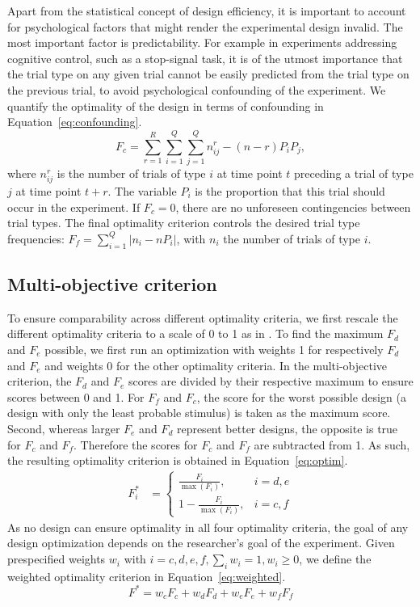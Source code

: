 \documentclass[article]{jss}
\begin{document}
Apart from the statistical concept of design efficiency, it is important to account for psychological factors that might render the experimental design invalid.  The most important factor is predictability.  For example in experiments addressing cognitive control, such as a stop-signal task, it is of the utmost importance that the trial type on any given trial cannot be easily predicted from the trial type on the previous trial, to avoid psychological confounding of the experiment.  We quantify the optimality of the design in terms of confounding in Equation~\ref{eq:confounding}.
\begin{equation} \label{eq:confounding}
F_c = \sum_{r=1}^R \sum_{i=1}^Q \sum_{j=1}^Q {n_{ij}^{r}-(n-r)P_iP_j },
\end{equation}
%
where $n_{ij}^r$ is the number of trials of type $i$ at time point $t$
preceding a trial of type $j$ at time point $t+r$.  The variable $P_i$
is the proportion that this trial should occur in the experiment.  If
$F_c=0$, there are no unforeseen contingencies between trial types.
The final optimality criterion controls the desired trial type
frequencies: $F_f = \sum_{i=1}^Q | n_i-nP_i | $, with $n_i$ the number
of trials of type $i$.

\subsection{Multi-objective criterion}

To ensure comparability across different optimality criteria, we first
rescale the different optimality criteria to a scale of 0 to 1 as in
\citet{Kao2009-yo}.  To find the maximum $F_d$ and $F_e$ possible, we
first run an optimization with weights 1 for respectively $F_d$ and
$F_e$ and weights 0 for the other optimality criteria.  In the
multi-objective criterion, the $F_d$ and $F_e$ scores are divided by
their respective maximum to ensure scores between 0 and 1.  For $F_f$
and $F_c$, the score for the worst possible design (a design with only
the least probable stimulus) is taken as the maximum score.  Second,
whereas larger $F_e$ and $F_d$ represent better designs, the opposite
is true for $F_c$ and $F_f$.  Therefore the scores for $F_c$ and $F_f$
are subtracted from 1.  As such, the resulting optimality criterion is
obtained in Equation~\ref{eq:optim}.
%
\begin{align} \label{eq:optim}
  F_i^* &= \left\{
\begin{array}{ll}
  \frac{F_i}{\max(F_i)},& i=d,e \\
  1-\frac{F_i}{\max(F_i)},&i=c,f
\end{array}\right.                            
\end{align}
%
As no design can ensure optimality in all four optimality criteria, the goal of any design optimization depends on the researcher's goal of the experiment.  Given prespecified weights $w_i$ with $i=c,d,e,f, \sum_iw_i=1,w_i\geq0$, we define the weighted optimality criterion in Equation~\ref{eq:weighted}.
%
\begin{equation}\label{eq:weighted}
F^*= w_cF_c + w_dF_d + w_eF_e + w_fF_f
\end{equation}
%
\end{document}
